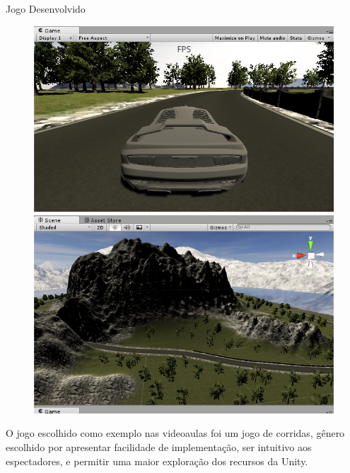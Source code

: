 \documentclass[10pt]{beamer}
\begin{document}
\begin{frame}{Jogo Desenvolvido}

\begin{figure}[H]
	\centering
	\begin{minipage}[b]{0.4\textwidth}
	\includegraphics[width=\textwidth]{figuras/game1.png}
	\end{minipage}
	\hfill
	\begin{minipage}[b]{0.4\textwidth}
		\includegraphics[width=\textwidth]{figuras/game2.png}
	\end{minipage}
\end{figure}

O jogo escolhido como exemplo nas videoaulas foi um jogo de corridas, gênero escolhido por apresentar facilidade de implementação, ser intuitivo aos espectadores,
e permitir uma maior exploração dos recursos da Unity.

\end{frame}
\end{document}
